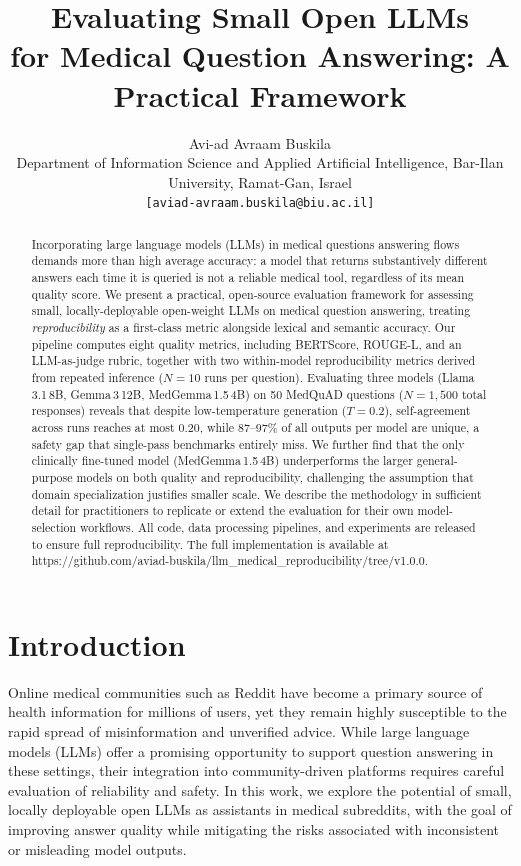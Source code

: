 \documentclass[11pt,twocolumn]{article}
\title{\textbf{Evaluating Small Open LLMs\\
for Medical Question Answering: A Practical Framework}}
\author{
  Avi-ad Avraam Buskila\\
  \small Department of Information Science and Applied Artificial Intelligence, Bar-Ilan University, Ramat-Gan, Israel\\[-2pt]
  \small \texttt{[aviad-avraam.buskila@biu.ac.il]}
}
\date{}
\begin{document}
\maketitle

\begin{abstract}
Incorporating large language models (LLMs) in medical questions answering 
flows demands more than high average accuracy: a model that returns 
substantively different answers each time it is queried is not a reliable 
medical tool, regardless of its mean quality score.
We present a practical, open-source evaluation framework for
assessing small, locally-deployable open-weight LLMs on medical
question answering, treating \emph{reproducibility} as a first-class
metric alongside lexical and semantic accuracy.
Our pipeline computes eight quality metrics, including BERTScore,
ROUGE-L, and an LLM-as-judge rubric, together with two
within-model reproducibility metrics derived from repeated inference
($N{=}10$ runs per question).
Evaluating three models
(Llama\,3.1\,8B, Gemma\,3\,12B, MedGemma\,1.5\,4B) on 50 MedQuAD
questions ($N{=}1{,}500$ total responses) reveals that despite
low-temperature generation ($T{=}0.2$), self-agreement across runs
reaches at most 0.20, while 87--97\% of all outputs per model are
unique, a safety gap that single-pass benchmarks entirely miss.
We further find that the only clinically fine-tuned model
(MedGemma\,1.5\,4B) underperforms the larger general-purpose models
on both quality and reproducibility, challenging the assumption that
domain specialization justifies smaller scale.
We describe the methodology in sufficient detail for practitioners
to replicate or extend the evaluation for their own model-selection
workflows. All code, data processing pipelines, and experiments are 
released to ensure full reproducibility. The full implementation 
is available at 
https://github.com/aviad-buskila/llm\_medical\_reproducibility/tree/v1.0.0.
\end{abstract}

\section{Introduction}

Online medical communities such as Reddit have become a primary 
source of health information for millions of users, yet they remain 
highly susceptible to the rapid spread of misinformation and unverified advice. 
While large language models (LLMs) offer a promising opportunity to support 
question answering in these settings, their integration into 
community-driven platforms requires careful evaluation of reliability
and safety. In this work, we explore the potential of small, 
locally deployable open LLMs as assistants in medical subreddits, 
with the goal of improving answer quality while mitigating the 
risks associated with inconsistent or misleading model outputs.
\end{document}
